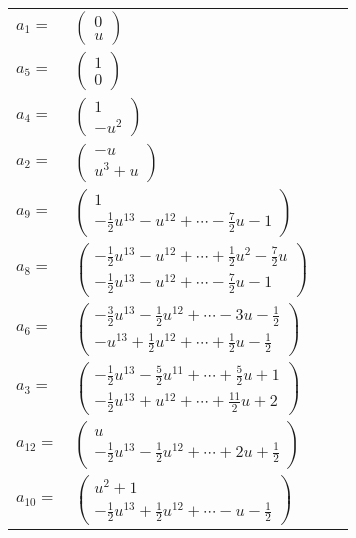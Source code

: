 \documentclass[1p]{elsarticle_modified}
\theoremstyle{definition}
\begin{document}
\begin{tabular}{m{7pt} m{180pt} m{7pt} m{180pt} }
\flushright $a_{1}=$&$\begin{pmatrix}0\\u\end{pmatrix}$ \\
\flushright $a_{5}=$&$\begin{pmatrix}1\\0\end{pmatrix}$ \\
\flushright $a_{4}=$&$\begin{pmatrix}1\\- u^2\end{pmatrix}$ \\
\flushright $a_{2}=$&$\begin{pmatrix}- u\\u^3+u\end{pmatrix}$ \\
\flushright $a_{9}=$&$\begin{pmatrix}1\\-\frac{1}{2} u^{13}- u^{12}+\cdots-\frac{7}{2} u-1\end{pmatrix}$ \\
\flushright $a_{8}=$&$\begin{pmatrix}-\frac{1}{2} u^{13}- u^{12}+\cdots+\frac{1}{2} u^2-\frac{7}{2} u\\-\frac{1}{2} u^{13}- u^{12}+\cdots-\frac{7}{2} u-1\end{pmatrix}$ \\
\flushright $a_{6}=$&$\begin{pmatrix}-\frac{3}{2} u^{13}-\frac{1}{2} u^{12}+\cdots-3 u-\frac{1}{2}\\- u^{13}+\frac{1}{2} u^{12}+\cdots+\frac{1}{2} u-\frac{1}{2}\end{pmatrix}$ \\
\flushright $a_{3}=$&$\begin{pmatrix}-\frac{1}{2} u^{13}-\frac{5}{2} u^{11}+\cdots+\frac{5}{2} u+1\\-\frac{1}{2} u^{13}+u^{12}+\cdots+\frac{11}{2} u+2\end{pmatrix}$ \\
\flushright $a_{12}=$&$\begin{pmatrix}u\\-\frac{1}{2} u^{13}-\frac{1}{2} u^{12}+\cdots+2 u+\frac{1}{2}\end{pmatrix}$ \\
\flushright $a_{10}=$&$\begin{pmatrix}u^2+1\\-\frac{1}{2} u^{13}+\frac{1}{2} u^{12}+\cdots- u-\frac{1}{2}\end{pmatrix}$ \\

\end{tabular}
\end{document}
